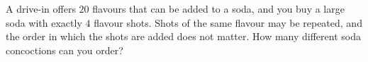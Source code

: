 A drive-in offers $20$ flavours that can be added to a soda, and you buy a large soda with exactly $4$ flavour shots. Shots of the same flavour may be repeated, and the order in which the shots are added does not matter. How many different soda concoctions can you order?
